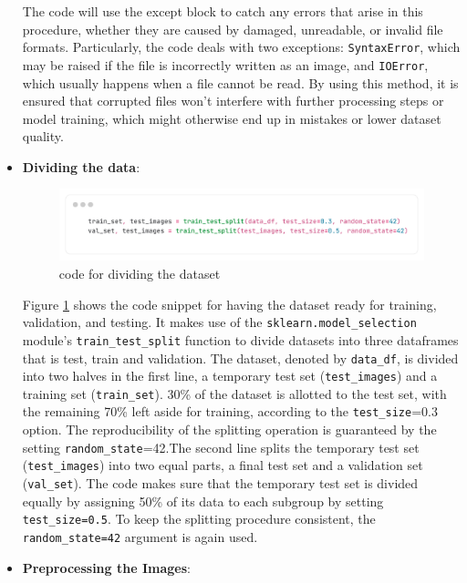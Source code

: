 \documentclass[12pt,onecolumn]{report}
\begin{document}
\begin{itemize}
    The code will use the except block to catch any errors that arise in this procedure, whether they are caused by damaged, unreadable, or invalid file formats. Particularly, the code deals with two exceptions: \texttt{SyntaxError}, which may be raised if the file is incorrectly written as an image, and \texttt{IOError}, which usually happens when a file cannot be read. By using this method, it is ensured that corrupted files won't interfere with further processing steps or model training, which might otherwise end up in mistakes or lower dataset quality. 
    \item \textbf{Dividing the data}:
    \begin{figure}[h!]
        \centering
        \includegraphics[width=0.9\columnwidth]{figures/data_spliting.png}  %
        \caption{code for dividing the dataset} %
        \label{fig:dividing_the_dataset} %
    \end{figure}
    Figure \ref{fig:dividing_the_dataset} shows the code snippet for having the dataset ready for training, validation, and testing. It makes use of the \texttt{sklearn.model\_selection} module's \texttt{train\_test\_split} function to divide datasets into three dataframes that is test, train and validation. The dataset, denoted by \texttt{data\_df}, is divided into two halves in the first line, a temporary test set (\texttt{test\_images}) and a training set (\texttt{train\_set}). 30\% of the dataset is allotted to the test set, with the remaining 70\% left aside for training, according to the \texttt{test\_size}=0.3 option. The reproducibility of the splitting operation is guaranteed by the setting \texttt{random\_state}=42.The second line splits the temporary test set (\texttt{test\_images}) into two equal parts, a final test set  and a validation set (\texttt{val\_set}). The code makes sure that the temporary test set is divided equally by assigning 50\% of its data to each subgroup by setting \texttt{test\_size=0.5}. To keep the splitting procedure consistent, the \texttt{random\_state=42} argument is again used.
    \item \textbf{Preprocessing the Images}:
    \begin{figure}[h!]
        \centering

\end{figure}
\end{itemize}
\end{document}
